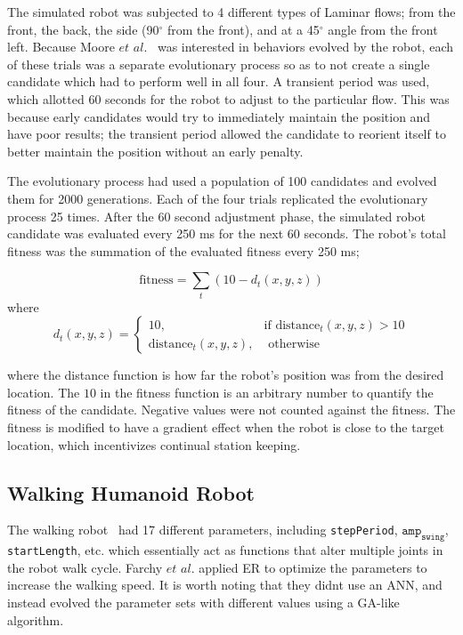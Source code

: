\documentclass{sig-alternate}
\begin{document}
 The simulated robot was subjected to 4 different types of Laminar flows; from the front, the back, the side (90$^\circ$ from the front), and at a 45$^\circ$ angle from the front left. Because Moore $et$ $al.$~\cite{Moore:2013:ESK:2463372.2463402} was interested in behaviors evolved by the robot, each of these trials was a separate evolutionary process so as to not create a single candidate which had to perform well in all four. A transient period was used, which allotted 60 seconds for the robot to adjust to the particular flow. This was because early candidates would try to immediately maintain the position and have poor results; the transient period allowed the candidate to reorient itself to better maintain the position without an early penalty. 
 
 The evolutionary process had used a population of 100 candidates and evolved them for 2000 generations. Each of the four trials replicated the evolutionary process 25 times. After the 60 second adjustment phase, the simulated robot candidate was evaluated every 250 ms for the next 60 seconds. The robot's total fitness was the summation of the evaluated fitness every 250 ms;

\begin{equation*}
	\textrm{fitness} = \sum_{t} (10 - d_t(x, y, z))
\end{equation*}
where
\[
	d_t(x, y, z) = 
		\begin{cases} 10, & \textrm{if distance}_t(x, y, z) > 10 \\
					  \textrm{distance}_t(x, y, z), & \textrm{ otherwise}
		\end{cases}
\]
 
 
  where the distance function is how far the robot's position was from the desired location. The $10$ in the fitness function is an arbitrary number to quantify the fitness of the candidate. Negative values were not counted against the fitness. The fitness is modified to have a gradient effect when the robot is close to the target location, which incentivizes continual station keeping.  
 
  \subsection{Walking Humanoid Robot}\label{Farchy Evolving}
  The walking robot  ~\cite{Farchy:2013:HRL:2484920.2484930}had 17 different parameters, including \texttt{stepPeriod}, $\texttt{amp}_\texttt{swing}$, \texttt{startLength}, etc. which essentially act as functions that alter multiple joints in the robot walk cycle. Farchy $et$ $al.$ applied ER to optimize the parameters to increase the walking speed. It is worth noting that they didnt use an ANN, and instead evolved the parameter sets with different values using a GA-like algorithm.
 
\end{document}
